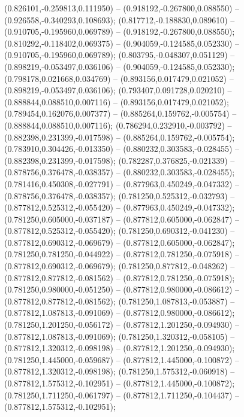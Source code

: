  (0.826101,-0.259813,0.111950) -- (0.918192,-0.267800,0.088550) -- (0.926558,-0.340293,0.108693);
 (0.817712,-0.188830,0.089610) -- (0.910705,-0.195960,0.069789) -- (0.918192,-0.267800,0.088550);
 (0.810292,-0.118402,0.069375) -- (0.904059,-0.124585,0.052330) -- (0.910705,-0.195960,0.069789);
 (0.803795,-0.048307,0.051129) -- (0.898219,-0.053497,0.036106) -- (0.904059,-0.124585,0.052330);
 (0.798178,0.021668,0.034769) -- (0.893156,0.017479,0.021052) -- (0.898219,-0.053497,0.036106);
 (0.793407,0.091728,0.020210) -- (0.888844,0.088510,0.007116) -- (0.893156,0.017479,0.021052);
 (0.789454,0.162076,0.007377) -- (0.885264,0.159762,-0.005754) -- (0.888844,0.088510,0.007116);
 (0.786294,0.232910,-0.003792) -- (0.882398,0.231399,-0.017598) -- (0.885264,0.159762,-0.005754);
 (0.783910,0.304426,-0.013350) -- (0.880232,0.303583,-0.028455) -- (0.882398,0.231399,-0.017598);
 (0.782287,0.376825,-0.021339) -- (0.878756,0.376478,-0.038357) -- (0.880232,0.303583,-0.028455);
 (0.781416,0.450308,-0.027791) -- (0.877963,0.450249,-0.047332) -- (0.878756,0.376478,-0.038357);
 (0.781250,0.525312,-0.032793) -- (0.877812,0.525312,-0.055420) -- (0.877963,0.450249,-0.047332);
 (0.781250,0.605000,-0.037187) -- (0.877812,0.605000,-0.062847) -- (0.877812,0.525312,-0.055420);
 (0.781250,0.690312,-0.041230) -- (0.877812,0.690312,-0.069679) -- (0.877812,0.605000,-0.062847);
 (0.781250,0.781250,-0.044922) -- (0.877812,0.781250,-0.075918) -- (0.877812,0.690312,-0.069679);
 (0.781250,0.877812,-0.048262) -- (0.877812,0.877812,-0.081562) -- (0.877812,0.781250,-0.075918);
 (0.781250,0.980000,-0.051250) -- (0.877812,0.980000,-0.086612) -- (0.877812,0.877812,-0.081562);
 (0.781250,1.087813,-0.053887) -- (0.877812,1.087813,-0.091069) -- (0.877812,0.980000,-0.086612);
 (0.781250,1.201250,-0.056172) -- (0.877812,1.201250,-0.094930) -- (0.877812,1.087813,-0.091069);
 (0.781250,1.320312,-0.058105) -- (0.877812,1.320312,-0.098198) -- (0.877812,1.201250,-0.094930);
 (0.781250,1.445000,-0.059687) -- (0.877812,1.445000,-0.100872) -- (0.877812,1.320312,-0.098198);
 (0.781250,1.575312,-0.060918) -- (0.877812,1.575312,-0.102951) -- (0.877812,1.445000,-0.100872);
 (0.781250,1.711250,-0.061797) -- (0.877812,1.711250,-0.104437) -- (0.877812,1.575312,-0.102951);
